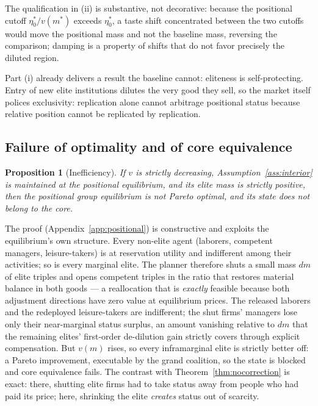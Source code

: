 \documentclass[12pt,letterpaper]{article}
\newtheorem{proposition}{Proposition}
\theoremstyle{definition}
\begin{document}
The qualification in (ii) is substantive, not decorative: because the positional cutoff $\eta^\ast_0/v(m^\ast)$ exceeds $\eta^\ast_0$, a taste shift concentrated between the two cutoffs would move the positional mass and not the baseline mass, reversing the comparison; damping is a property of shifts that do not favor precisely the diluted region.

Part (i) already delivers a result the baseline cannot: eliteness is self-protecting.
Entry of new elite institutions dilutes the very good they sell, so the market itself polices exclusivity: replication alone cannot arbitrage positional status because relative position cannot be replicated by replication.

\subsection{Failure of optimality and of core equivalence}

\begin{proposition}[Inefficiency]\label{prop:inefficiency} If $v$ is strictly decreasing, Assumption~\ref{ass:interior} is maintained at the positional equilibrium, and its elite mass is strictly positive, then the positional group equilibrium is not Pareto optimal, and its state does not belong to the core.
\end{proposition}

The proof (Appendix~\ref{app:positional}) is constructive and exploits the equilibrium's own structure.
Every non-elite agent (laborers, competent managers, leisure-takers) is at reservation utility and indifferent among their activities; so is every marginal elite.
The planner therefore shuts a small mass $dm$ of elite triples and opens competent triples in the ratio that restores material balance in both goods --- a reallocation that is \emph{exactly} feasible because both adjustment directions have zero value at equilibrium prices.
The released laborers and the redeployed leisure-takers are indifferent; the shut firms' managers lose only their near-marginal status surplus, an amount vanishing relative to $dm$ that the remaining elites' first-order de-dilution gain strictly covers through explicit compensation.
But $v(m)$ rises, so every inframarginal elite is strictly better off: a Pareto improvement, executable by the grand coalition, so the state is blocked and core equivalence fails.
The contrast with Theorem~\ref{thm:nocorrection} is exact: there, shutting elite firms had to take status away from people who had paid its price; here, shrinking the elite \emph{creates} status out of scarcity.
\end{document}
